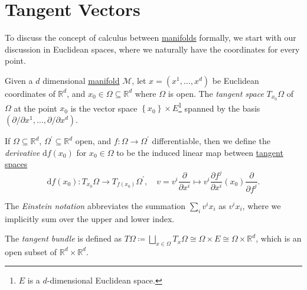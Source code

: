\section{Tangent Vectors}
To discuss the concept of calculus between \hyperref[def:smooth-manifold]{manifolds} formally, we start with our discussion in Euclidean spaces, where we naturally have the coordinates for every point.

\begin{definition}\label{def:tangent-space-of-Euclidean-space}
	Given a \(d\) dimensional \hyperref[def:topological-manifold]{manifold} \(\mathcal{M} \), let \(x = (x^1, \ldots , x^d)\) be Euclidean coordinates of \(\mathbb{R} ^d\), and \(x_0\in \Omega \subseteq \mathbb{R} ^d\) where \(\Omega \) is open. The \emph{tangent space} \(T_{x_0}\Omega \) of \(\Omega \) at the point \(x_0\) is the vector space \(\left\{ x_0 \right\} \times E\)\footnote{\(E\) is a \(d\)-dimensional Euclidean space.} spanned by the basis \((\partial / \partial x^1, \ldots , \partial / \partial x^d)\).
\end{definition}

\begin{definition}\label{def:derivative-of-Euclidean-space}
	If \(\Omega \subseteq \mathbb{R} ^d\), \(\Omega ^\prime \subseteq \mathbb{R} ^d\) open, and \(f\colon \Omega \to \Omega ^\prime \) differentiable, then we define the \emph{derivative} \(\mathrm{d} f(x_0)\) for \(x_0 \in \Omega \) to be the induced linear map between \hyperref[def:tangent-space-of-Euclidean-space]{tangent spaces}
	\[
		\mathrm{d} f(x_0) \colon T_{x_0}\Omega \to T_{f(x_0)}\Omega ^\prime,\quad
		v = v^i \frac{\partial }{\partial x^i} \mapsto v^i \frac{\partial f^j}{\partial x^i} (x_0) \frac{\partial }{\partial f^j}.
	\]
\end{definition}

\begin{notation}
	The \emph{Einstein notation} abbreviates the summation \(\sum_{i} v^i x_i\) as \(v^i x_i\), where we implicitly sum over the upper and lower index.
\end{notation}

\begin{definition}\label{def:tangent-bundle-of-Euclidean-space}
	The \emph{tangent bundle} is defined as \(T \Omega\coloneqq \bigsqcup_{x\in \Omega }T_x \Omega \cong \Omega \times E \cong \Omega \times \mathbb{R} ^d\), which is an open subset of \(\mathbb{R} ^d \times \mathbb{R} ^d\).
\end{definition}

